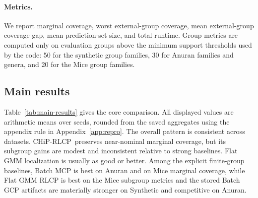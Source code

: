 \documentclass{article}
\newcommand{\chip}{CHiP-RLCP}
\begin{document}
\paragraph{Metrics.}
We report marginal coverage, worst external-group coverage, mean external-group coverage gap, mean prediction-set size, and total runtime. Group metrics are computed only on evaluation groups above the minimum support thresholds used by the code: 50 for the synthetic group families, 30 for Anuran families and genera, and 20 for the Mice group families.

\subsection{Main results}
Table~\ref{tab:main-results} gives the core comparison. All displayed values are arithmetic means over seeds, rounded from the saved aggregates using the appendix rule in Appendix~\ref{app:repro}. The overall pattern is consistent across datasets. \chip\ preserves near-nominal marginal coverage, but its subgroup gains are modest and inconsistent relative to strong baselines. Flat GMM localization is usually as good or better. Among the explicit finite-group baselines, Batch MCP is best on Anuran and on Mice marginal coverage, while Flat GMM RLCP is best on the Mice subgroup metrics and the stored Batch GCP artifacts are materially stronger on Synthetic and competitive on Anuran.
\end{document}
